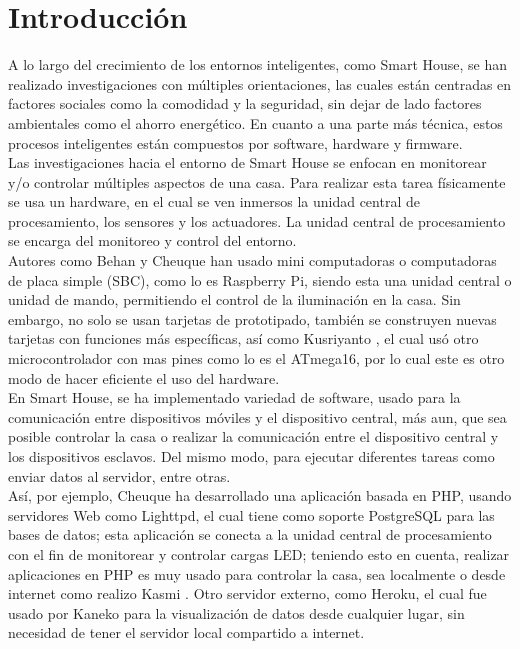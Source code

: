 \chapter{Introducción}

A lo largo del crecimiento de los entornos inteligentes, como Smart House, se han realizado investigaciones con múltiples orientaciones, las cuales están centradas en factores sociales como la comodidad y la seguridad, sin dejar de lado factores ambientales como el ahorro energético. En cuanto a una parte más técnica, estos procesos inteligentes están compuestos por software, hardware y firmware.\\

Las investigaciones hacia el entorno de Smart House se enfocan en monitorear y/o controlar múltiples aspectos de una casa. Para realizar esta tarea físicamente se usa un hardware, en el cual se ven inmersos la unidad central de procesamiento, los sensores y los actuadores. La unidad central de procesamiento se encarga del monitoreo y control del entorno.\\

Autores como Behan \cite{Behan2013} y Cheuque \cite{Cheuque2015} han usado mini computadoras o computadoras de placa simple (SBC), como lo es Raspberry Pi,  siendo esta una unidad central o unidad de mando, permitiendo el control de la iluminación en la casa. Sin embargo, no solo se usan tarjetas de prototipado, también se construyen nuevas tarjetas con funciones más específicas, así como Kusriyanto \cite{Kusriyanto2015}, el cual usó otro microcontrolador con mas pines como lo es el ATmega16, por lo cual este es otro modo de hacer eficiente el uso del hardware.\\

En Smart House, se ha implementado variedad de software, usado para la comunicación entre dispositivos móviles y el dispositivo central, más aun, que sea posible controlar la casa o realizar la comunicación entre el dispositivo central y los dispositivos esclavos. Del mismo modo, para ejecutar diferentes tareas como enviar datos al servidor, entre otras.\\

Así, por ejemplo, Cheuque \cite{Cheuque2015} ha desarrollado una aplicación basada en PHP, usando servidores Web como Lighttpd, el cual tiene como soporte PostgreSQL para las bases de datos; esta aplicación se conecta a la unidad central de procesamiento con el fin de monitorear y controlar cargas LED; teniendo esto en cuenta, realizar aplicaciones en PHP es muy usado para controlar la casa, sea localmente o desde internet como realizo Kasmi \cite{Kasmi2016}. Otro servidor externo, como Heroku, el cual fue usado por Kaneko \cite{Kaneko2017} para la visualización de datos desde cualquier lugar, sin necesidad de tener el servidor local compartido a internet.\\

